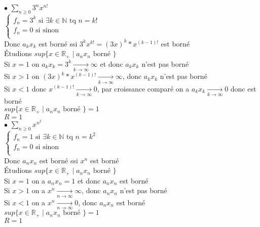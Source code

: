 \documentclass{article}
\newcommand{\mylim}[2]{\underset{#1 \rightarrow #2}{\longrightarrow}}
\begin{document}
\noindent $\bullet$ $\sum_{n \geq 0} 3^n x^{n!}$\\
$\left\{
    \begin{array}{ll}
        f_n = 3^k \mbox{ si } \exists k \in \mathbb{N} \mbox{ tq } n = k!\\
        f_n = 0 \mbox{ si sinon}\\
    \end{array}
\right.$\\
Donc $a_k x_k$ est borné ssi $3^k x^{k!} = (3x)^k * x^{(k-1)!}$ est borné\\
\noindent Étudions $sup \{x\in \mathbb{R}_+ \;|\; a_n x_n \mbox{ borné }\}$\\
Si $x = 1$ on $a_k x_k = 3^k \mylim{k}{\infty} \infty$ et donc $a_k x_k$ n'est pas borné\\
Si $x > 1$ on $(3x)^k * x^{(k-1)!} \mylim{k}{\infty} \infty$, donc $a_k x_k$ n'est pas borné\\
Si $x < 1$ donc $x^{(k-1)!} \mylim{k}{\infty} 0$, par croissance comparé on a $a_k x_k \mylim{k}{\infty} 0$ donc est borné\\
$sup \{x\in \mathbb{R}_+ \;|\; a_n x_n \mbox{ borné }\} = 1$\\
$R = 1$\\

\noindent $\bullet$ $\sum_{n \geq 0} x^{n^2}$\\
$\left\{
    \begin{array}{ll}
        f_n = 1 \mbox{ si } \exists k \in \mathbb{N} \mbox{ tq } n = k^2\\
        f_n = 0 \mbox{ si sinon}\\
    \end{array}
\right.$\\
Donc $a_n x_n$ est borné ssi $x^n$ est borné\\
\noindent Étudions $sup \{x\in \mathbb{R}_+ \;|\; a_n x_n \mbox{ borné }\}$\\
Si $x = 1$ on a $a_n x_n = 1$ et donc $a_n x_n$ est borné\\
Si $x > 1$ on a $x^n \mylim{n}{\infty} \infty$, donc $a_n x_n$ n'est pas borné\\
Si $x < 1$ on a $x^n \mylim{n}{\infty} 0$, donc $a_n x_n$ est borné\\
$sup \{x\in \mathbb{R}_+ \;|\; a_n x_n \mbox{ borné }\} = 1$\\
$R = 1$
\end{document}
